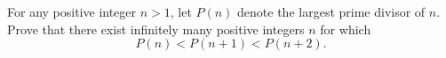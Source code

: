 For any positive integer $ n>1$, let $ P\left(n\right)$ denote the largest prime divisor of $ n$. Prove that there exist infinitely many positive integers $ n$ for which
\[ P\left(n\right)<P\left(n+1\right)<P\left(n+2\right).\]